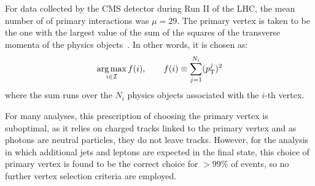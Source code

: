 For data collected by the CMS detector during Run II of the LHC, the mean number of of primary interactions was $\mu = 29$. 
The primary vertex is taken to be the one with the largest value of the sum of the squares of the transverse momenta of the physics objects~\cite{Contardo:2020886}.
In other words, it is chosen as:
\begin{equation}
    \operatorname*{arg\,max}_{i \in \mathcal I} f(i), \qquad f(i) \equiv \sum_{j=1}^{N_i} (p_{\mathrm{T}}^j)^2
\end{equation}
where the sum runs over the $N_i$ physics objects associated with the $i$-th vertex.

For many \Hgg analyses, this prescription of choosing the primary vertex is suboptimal, as it relies on charged tracks linked to the primary vertex and as photons are neutral particles, they do not leave tracks.
However, for the \ttH analysis in which additional jets and leptons are expected in the final state, this choice of primary vertex is found to be the correct choice for $>99$\% of \ttH events, so no further vertex selection criteria are employed. %
